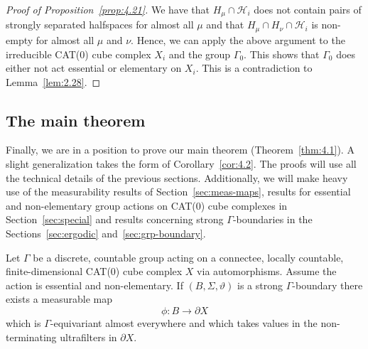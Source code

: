 \begin{proof}[Proof of Proposition~\ref{prop:4.21}]
      We have that \(H_\mu \cap \mathcal{H}_i\) does not contain pairs of strongly separated halfspaces for almost all \(\mu\) and that \(H_\mu \cap H_\nu \cap \mathcal{H}_i\) is non-empty for almost all \(\mu\) and \(\nu\). Hence, we can apply the above argument to the irreducible CAT(0) cube complex \(X_i\) and the group \(\Gamma_0\). This shows that \(\Gamma_0\) does either not act essential or elementary on \(X_i\). This is a contradiction to Lemma~\ref{lem:2.28}.
\end{proof}
  
\subsection{The main theorem}
\label{sec:main-proof}

Finally, we are in a position to prove our main theorem (Theorem~\ref{thm:4.1}). A slight generalization takes the form of Corollary~\ref{cor:4.2}. The proofs will use all the technical details of the previous sections. Additionally, we will make heavy use of the measurability results of Section~\ref{sec:meas-maps}, results for essential and non-elementary group actions on CAT(0) cube complexes in Section~\ref{sec:special} and results concerning strong \(\Gamma\)-boundaries in the Sections~\ref{sec:ergodic} and~\ref{sec:grp-boundary}.

\begin{thm}[{\cite[Theorem~4.1]{MR3509968}}]
  \label{thm:4.1}
  Let \(\Gamma\) be a discrete, countable group acting on a connectee, locally countable, finite-dimensional CAT(0) cube complex \(X\) via automorphisms. Assume the action is essential and non-elementary. If \((B, \Sigma, \vartheta)\) is a strong \(\Gamma\)-boundary there exists a measurable map
  \[
    \phi\colon B \to \partial X
  \]
  which is \(\Gamma\)-equivariant almost everywhere and which takes values in the non-terminating ultrafilters in \(\partial X\).
\end{thm}

